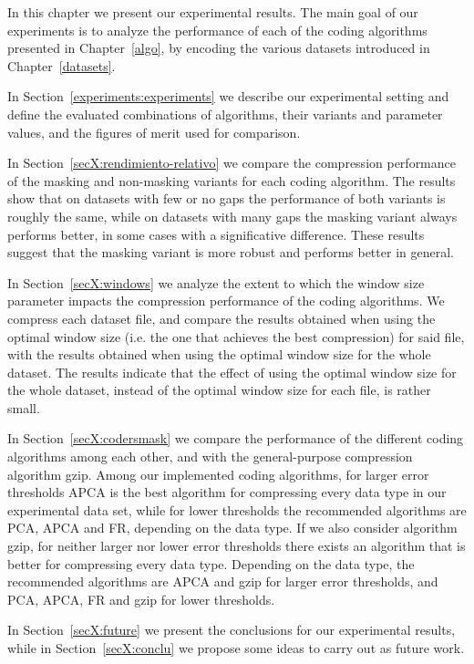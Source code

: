 
In this chapter we present our experimental results. The main goal of our experiments is to analyze the performance of each of the coding algorithms presented in Chapter~\ref{algo}, by encoding the various datasets introduced in Chapter~\ref{datasets}. 

In Section~\ref{experiments:experiments} we describe our experimental setting and define the evaluated combinations of algorithms, their variants and parameter values, and the figures of merit used for comparison. 

In Section~\ref{secX:rendimiento-relativo} we compare the compression performance of the masking and non-masking variants for each coding algorithm. The results show that on datasets with few or no gaps the performance of both variants is roughly the same, while on datasets with many gaps the masking variant always performs better, in some cases with a significative difference. These results suggest that the masking variant is more robust and performs better in general. 

In Section~\ref{secX:windows} we analyze the extent to which the window size parameter impacts the compression performance of the coding algorithms. We compress each dataset file, and compare the results obtained when using the optimal window size (i.e. the one that achieves the best compression) for said file, with the results obtained when using the optimal window size for the whole dataset. The results indicate that the effect of using the optimal window size for the whole dataset, instead of the optimal window size for each file, is rather small. 

In Section~\ref{secX:codersmask} we compare the performance of the different coding algorithms among each other, and with the general-purpose compression algorithm gzip. Among our implemented coding algorithms, for larger error thresholds APCA is the best algorithm for compressing every data type in our experimental data set, while for lower thresholds the recommended algorithms are PCA, APCA and FR, depending on the data type. If we also consider algorithm gzip, for neither larger nor lower error thresholds there exists an algorithm that is better for compressing every data type. Depending on the data type, the recommended algorithms are APCA and gzip for larger error thresholds, and PCA, APCA, FR and gzip for lower thresholds.


In Section~\ref{secX:future} we present the conclusions for our experimental results, while in Section~\ref{secX:conclu} we propose some ideas to carry out as future work.

